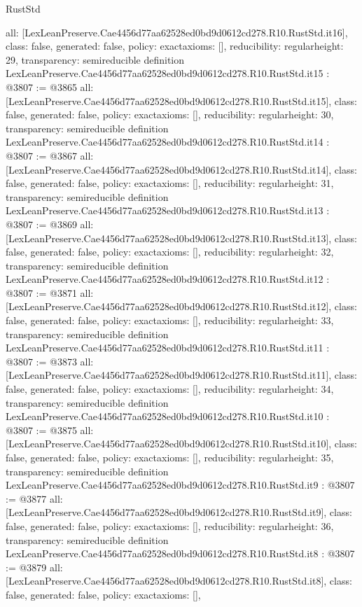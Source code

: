 \begin{lexlean}{RustStd}
\begin{coremodule}
{  all: [LexLeanPreserve.Cae4456d77aa62528ed0bd9d0612cd278.R10.RustStd.it16],
  class: false,
  generated: false,
  policy: exact{axioms: []},
  reducibility: regular{height: 29},
  transparency: semireducible
}
definition LexLeanPreserve.Cae4456d77aa62528ed0bd9d0612cd278.R10.RustStd.it15 : @3807 := @3865 {
  all: [LexLeanPreserve.Cae4456d77aa62528ed0bd9d0612cd278.R10.RustStd.it15],
  class: false,
  generated: false,
  policy: exact{axioms: []},
  reducibility: regular{height: 30},
  transparency: semireducible
}
definition LexLeanPreserve.Cae4456d77aa62528ed0bd9d0612cd278.R10.RustStd.it14 : @3807 := @3867 {
  all: [LexLeanPreserve.Cae4456d77aa62528ed0bd9d0612cd278.R10.RustStd.it14],
  class: false,
  generated: false,
  policy: exact{axioms: []},
  reducibility: regular{height: 31},
  transparency: semireducible
}
definition LexLeanPreserve.Cae4456d77aa62528ed0bd9d0612cd278.R10.RustStd.it13 : @3807 := @3869 {
  all: [LexLeanPreserve.Cae4456d77aa62528ed0bd9d0612cd278.R10.RustStd.it13],
  class: false,
  generated: false,
  policy: exact{axioms: []},
  reducibility: regular{height: 32},
  transparency: semireducible
}
definition LexLeanPreserve.Cae4456d77aa62528ed0bd9d0612cd278.R10.RustStd.it12 : @3807 := @3871 {
  all: [LexLeanPreserve.Cae4456d77aa62528ed0bd9d0612cd278.R10.RustStd.it12],
  class: false,
  generated: false,
  policy: exact{axioms: []},
  reducibility: regular{height: 33},
  transparency: semireducible
}
definition LexLeanPreserve.Cae4456d77aa62528ed0bd9d0612cd278.R10.RustStd.it11 : @3807 := @3873 {
  all: [LexLeanPreserve.Cae4456d77aa62528ed0bd9d0612cd278.R10.RustStd.it11],
  class: false,
  generated: false,
  policy: exact{axioms: []},
  reducibility: regular{height: 34},
  transparency: semireducible
}
definition LexLeanPreserve.Cae4456d77aa62528ed0bd9d0612cd278.R10.RustStd.it10 : @3807 := @3875 {
  all: [LexLeanPreserve.Cae4456d77aa62528ed0bd9d0612cd278.R10.RustStd.it10],
  class: false,
  generated: false,
  policy: exact{axioms: []},
  reducibility: regular{height: 35},
  transparency: semireducible
}
definition LexLeanPreserve.Cae4456d77aa62528ed0bd9d0612cd278.R10.RustStd.it9 : @3807 := @3877 {
  all: [LexLeanPreserve.Cae4456d77aa62528ed0bd9d0612cd278.R10.RustStd.it9],
  class: false,
  generated: false,
  policy: exact{axioms: []},
  reducibility: regular{height: 36},
  transparency: semireducible
}
definition LexLeanPreserve.Cae4456d77aa62528ed0bd9d0612cd278.R10.RustStd.it8 : @3807 := @3879 {
  all: [LexLeanPreserve.Cae4456d77aa62528ed0bd9d0612cd278.R10.RustStd.it8],
  class: false,
  generated: false,
  policy: exact{axioms: []},
}
\end{coremodule}
\end{lexlean}
